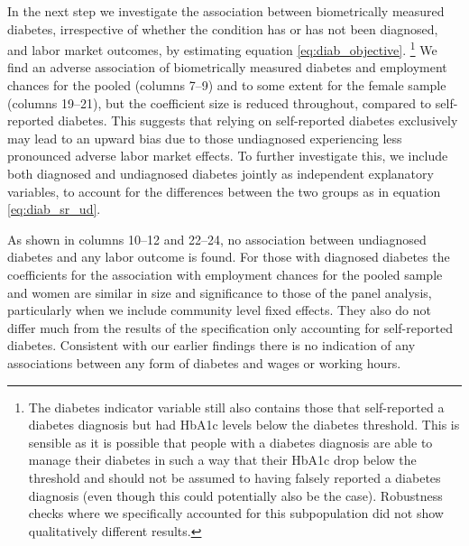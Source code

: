 \documentclass[12pt,english,british]{article}
\begin{document}
In the next step we investigate the association between biometrically measured
diabetes, irrespective of whether
the condition has or has not been diagnosed, and labor market outcomes, by estimating equation \ref{eq:diab_objective}. \footnote{The diabetes indicator
variable still also contains those that self-reported a diabetes diagnosis
but had \ac{HbA1c} levels below the diabetes threshold. This is sensible as it is possible that people with a diabetes diagnosis are able to manage their diabetes in such a way that their \ac{HbA1c} drop below the threshold and should not be assumed to having falsely reported a diabetes diagnosis (even though this could potentially also be the case). Robustness checks where we specifically accounted for this subpopulation
did not show qualitatively different results.}  We find an adverse association of biometrically measured diabetes and employment
chances for the pooled (columns 7--9) and to some extent for the female sample (columns 19--21), but the coefficient size is reduced throughout, compared to self-reported diabetes. This suggests that relying on self-reported
diabetes exclusively may lead to an upward bias due to those undiagnosed experiencing less pronounced adverse labor market effects.
To further investigate this, we include both diagnosed and undiagnosed diabetes jointly as independent explanatory variables, to account for the differences between the two groups as in equation \ref{eq:diab_sr_ud}.

As shown in columns 10--12 and 22--24, no association between undiagnosed
diabetes and any labor outcome is found. For those with diagnosed
diabetes the coefficients for the association with employment chances
 for the pooled sample and women are similar in size and significance to those of the panel analysis, particularly when we include community level fixed effects. They also do not differ much from the results of the specification only accounting for self-reported diabetes. Consistent with our earlier findings there is no indication of any associations between any form of diabetes and wages or working hours. 
 
\end{document}
